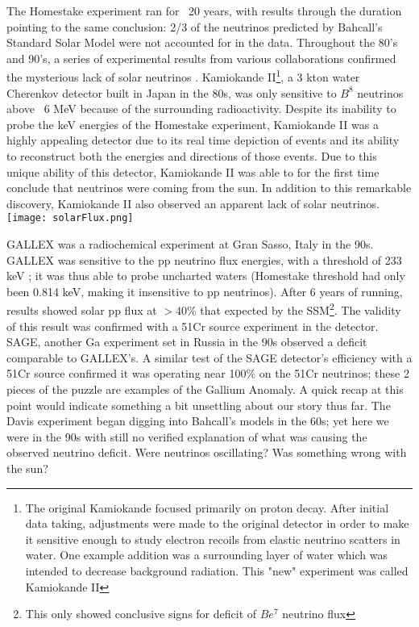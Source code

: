 \documentclass[12pt]{article}
\begin{document}
\par The Homestake experiment ran for ~20 years, with results through the duration pointing to the same conclusion: 2/3 of the neutrinos predicted by Bahcall's Standard Solar Model were not accounted for in the data\cite{ray0}.  Throughout the 80's and 90's, a series of experimental results from various collaborations confirmed the mysterious lack of solar neutrinos \cite{rayreview} \cite{kam0} \cite{sno0}.  Kamiokande II\footnote{The original Kamiokande focused primarily on proton decay. After initial data taking, adjustments were made to the original detector in order to make it sensitive enough to study electron recoils from elastic neutrino scatters in water. One example addition was a surrounding layer of water which was intended to decrease background radiation.  This "new" experiment was called Kamiokande II}, a 3 kton water Cherenkov detector built in Japan in the 80s, was only sensitive to $B^8$ neutrinos above ~6 MeV\cite{kam0} because of the surrounding radioactivity. Despite its inability to probe the keV energies of the Homestake experiment, Kamiokande II was a highly appealing detector due to its real time depiction of events and its ability to reconstruct both the energies and directions of those events\cite{kam0}. Due to this unique ability of this detector, Kamiokande II was able to for the first time conclude that neutrinos were coming from the sun.  In addition to this remarkable discovery, Kamiokande II also observed an apparent lack of solar neutrinos.
\\\texttt{[image: solarFlux.png]}
\par GALLEX was a radiochemical experiment at Gran Sasso, Italy in the 90s. GALLEX was sensitive to the pp neutrino flux energies, with a threshold of 233 keV \cite{gal0}; it was thus able to probe uncharted waters (Homestake threshold had only been 0.814 keV, making it insensitive to pp neutrinos).   After 6 years of running, results showed solar pp flux at $>40\%$ that expected by the SSM\footnote{This only showed conclusive signs for deficit of $Be^7$ neutrino flux}. The validity of this result was confirmed with a 51Cr source experiment in the detector\cite{gal2}. SAGE, another Ga experiment set in Russia in the 90s observed a deficit comparable to GALLEX's.   A similar test of the SAGE detector's efficiency with a 51Cr source confirmed it was operating near 100\% on the 51Cr neutrinos\cite{sage};  these 2 pieces of the puzzle are examples of the Gallium Anomaly.  
A quick recap at this point would indicate something a bit unsettling about our story thus far. The Davis experiment began digging into Bahcall's models in the 60s; yet here we were in the 90s with still no verified explanation of what was causing the observed neutrino deficit.  Were neutrinos oscillating? Was something wrong with the sun?\cite{Clarke} 
\end{document}
